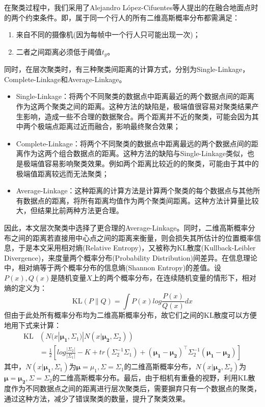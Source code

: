 在聚类过程中，我们采用了Alejandro López-Cifuentes\cite{A2018Semantic}等人提出的在融合地面点时的两个约束条件。即，属于同一个行人的所有二维高斯概率分布都需满足：
\begin{enumerate}
    \item 来自不同的摄像机(因为每帧中一个行人只可能出现一次)；
    \item 二者之间距离必须低于阈值$t_{g}$。
\end{enumerate}
同时，在层次聚类时，有三种聚类间距离的计算方式，分别为Single-Linkage，Complete-Linkage和Average-Linkage。
\begin{itemize}
    \item Single-Linkage：将两个不同聚类的数据点中距离最近的两个数据点间的距离作为这两个聚类之间的距离。这种方法的缺陷是，极端值很容易对聚类结果产生影响，造成一些不合理的数据聚合。两个距离并不近的聚类，可能会因为其中两个极端点距离过近而融合，影响最终聚合效果；
    \item Complete-Linkage：将两个不同聚类的数据点中距离最远的两个数据点间的距离作为这两个组合数据点的距离。这种方法的缺陷与Single-Linkage类似，也是极端值容易影响聚类效果。例如两个距离比较近的的聚类，可能由于其中的极端值距离较远而无法聚类；
    \item Average-Linkage：这种距离的计算方法是计算两个聚类的每个数据点与其他所有数据点的距离，将所有距离均值作为两个聚类间距离。这种方法计算量比较大，但结果比前两种方法更合理。
\end{itemize}
因此，本文层次聚类中选择了更合理的Average-Linkage。同时，二维高斯概率分布之间的距离若直接用中心点之间的距离来衡量，则会损失其所估计的位置概率信息，于是本文采用相对熵(Relative Entropy)，又被称为KL散度(Kullback-Leibler Divergence)，来度量两个概率分布(Probability Distribution)间差异。在信息理论中，相对熵等于两个概率分布的信息熵(Shannon Entropy)的差值。设$P(x), Q(x)$是随机变量$X$上的两个概率分布，在连续随机变量的情形下，相对熵的定义为：
\begin{equation}
  \text{KL}(P\|Q)=\int P(x)log{\frac{P(x)}{Q(x)}}dx
\end{equation}
但由于此处所有概率分布均为二维高斯概率分布，故它们之间的KL散度可以方便地用下式来计算：
\begin{equation}
  \begin{aligned}
  \text{KL}&\left(N(x|\bm{\mu_1},\Sigma_1)|N(x|\bm{\mu_2},\Sigma_2)\right) \\
  &=\frac{1}{2}\left[log{\frac{|\Sigma_2|}{|\Sigma_1|}}-K+tr(\Sigma_2^{-1}\Sigma_1)+(\bm{\mu_1}-\bm{\mu_2})^\top\Sigma_2^{-1}(\bm{\mu_1}-\bm{\mu_2})\right]
  \end{aligned}
\end{equation}
其中，$N(x|\bm{\mu_1},\Sigma_1)$为$\bm{\mu}=\mu_1, \Sigma=\Sigma_1$的二维高斯概率分布，$N(x|\bm{\bm{\mu_2}},\Sigma_2)$为$\bm{\mu}=\bm{\mu_2}, \Sigma=\Sigma_2$的二维高斯概率分布。最后，由于相机有重叠的视野，利用KL散度作为不同数据点之间的距离进行层次聚类后，需要摒弃只有一个数据点的聚类，通过这种方法，减少了错误聚类的数量，提升了聚类效果。

